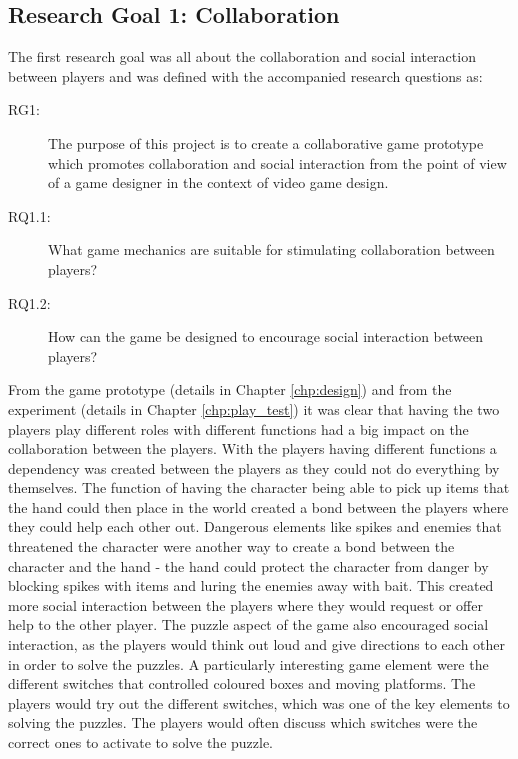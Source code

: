 \subsection{Research Goal 1: Collaboration}
The first research goal was all about the collaboration and social interaction between players and was defined with the accompanied research questions as:
\begin{description}
	\item[RG1:] The purpose of this project is to create a collaborative game prototype which promotes collaboration and social interaction from the point of view of a game designer in the context of video game design.
	\item[RQ1.1:] What game mechanics are suitable for stimulating collaboration between players?
	\item[RQ1.2:] How can the game be designed to encourage social interaction between players?
\end{description}
From the game prototype (details in Chapter \ref{chp:design}) and from the experiment (details in Chapter \ref{chp:play_test}) it was clear that having the two players play different roles with different functions had a big impact on the collaboration between the players. With the players having different functions a dependency was created between the players as they could not do everything  by themselves. The function of having the character being able to pick up items that the hand could then place in the world created a bond between the players where they could help each other out. Dangerous elements like spikes and enemies that threatened the character were another way to create a bond between the character and the hand - the hand could protect the character from danger by blocking spikes with items and luring the enemies away with bait. This created more social interaction between the players where they would request or offer help to the other player. The puzzle aspect of the game also encouraged social interaction, as the players would think out loud and give directions to each other in order to solve the puzzles. A particularly interesting game element were the different switches that controlled coloured boxes and moving platforms. The players would try out the different switches, which was one of the key elements to solving the puzzles. The players would often discuss which switches were the correct ones to activate to solve the puzzle.

